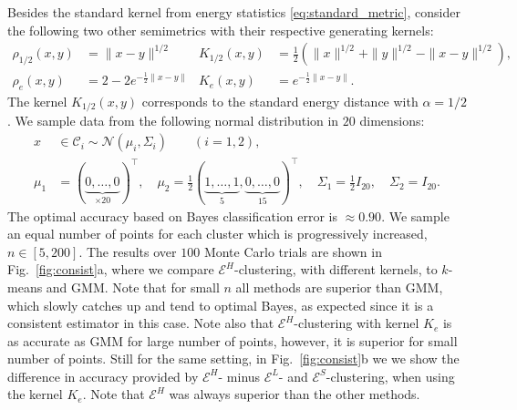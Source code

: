 \documentclass[aps,preprint,nofootinbib,floatfix]{revtex4-1}
\newcommand\kk{K}
\newcommand\C{{\mathcal{C}}}
\begin{document}
Besides the standard kernel from energy statistics 
\eqref{eq:standard_metric}, 
consider the following two other semimetrics with their respective generating
kernels:
\begin{align}
\rho_{1/2}(x,y) &= \| x-y \|^{1/2} & 
 \kk_{1/2}(x,y) &= \tfrac{1}{2} \left( 
\| x \|^{1/2} + \| y \|^{1/2} 
- \| x-y \|^{1/2} \right), \label{eq:rhohalf}\\
\rho_{e}(x,y) &= 
2 - 2 e^{-\tfrac{1}{2}\| x- y\|} &
 \kk_{e}(x,y) &= e^{-\tfrac{1}{2}\| x-y\|}.
\label{eq:rhoe}
\end{align}
The kernel $K_{1/2}(x,y)$ corresponds to the standard energy distance
with $\alpha=1/2$.
We sample data from the following normal distribution in $20$ dimensions:
\begin{equation}
\label{eq:20gauss}
\begin{split}
x &\in \C_i \sim \mathcal{N}(\mu_i,\Sigma_i) \qquad (i=1,2), \\
\mu_1 &= (\underbrace{0,\dotsc,0}_{\times 20})^\top ,\quad
\mu_2 = \tfrac{1}{2} 
(\underbrace{1,\dotsc,1}_{5},\underbrace{0,\dotsc,0}_{15})^\top, \quad
\Sigma_1 = \tfrac{1}{2} I_{20},  \quad
\Sigma_2 = I_{20}.
\end{split}
\end{equation}
The optimal accuracy based on Bayes
classification error is $\approx 0.90$. 
We sample an equal number of points for each cluster which is progressively
increased, $n \in [5, 200]$. 
The results over $100$ Monte Carlo trials are 
shown in Fig.~\ref{fig:consist}a, where we compare
$\mathcal{E}^H$-clustering, with different
kernels, to $k$-means and GMM.
Note that for small $n$ all methods
are superior than GMM, which slowly catches up and tend to optimal Bayes,
as expected since it is a consistent estimator in this case. 
Note also that $\mathcal{E}^H$-clustering
with kernel $\kk_e$ is as accurate as GMM for large number of points, however,
it is superior for small number of points. Still for
the same setting, in Fig.~\ref{fig:consist}b we
we show the difference in accuracy provided by $\mathcal{E}^H$- minus
$\mathcal{E}^L$- and $\mathcal{E}^S$-clustering, when using the
kernel $\kk_e$.
Note that $\mathcal{E}^H$ was
always superior than the other methods.
\end{document}
